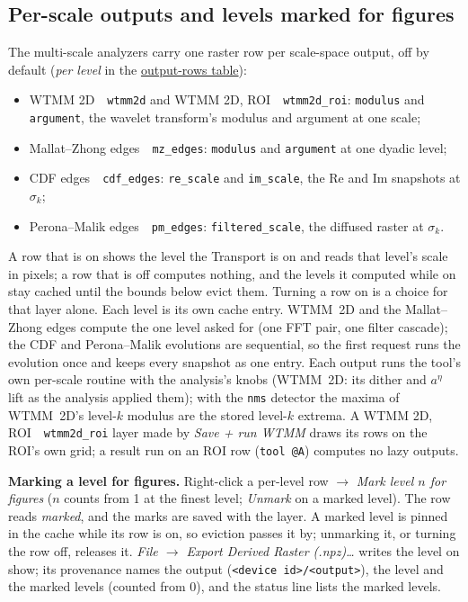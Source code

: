 \documentclass[10pt]{article}
\newcommand{\dev}[1]{\texttt{#1}}
\newcommand{\tool}[2]{#1~\textperiodcentered~\dev{#2}}
\begin{document}
\subsection*{Per-scale outputs and levels marked for figures}\label{sec:perscale}
The multi-scale analyzers carry one raster row per scale-space output, off by default
(\emph{per level} in the \hyperref[tab:outputs]{output-rows table}):
\begin{itemize}\itemsep2pt
  \item \tool{WTMM 2D}{wtmm2d} and \tool{WTMM 2D, ROI}{wtmm2d\_roi}: \texttt{modulus} and
        \texttt{argument}, the wavelet transform's modulus and argument at one scale;
  \item \tool{Mallat--Zhong edges}{mz\_edges}: \texttt{modulus} and \texttt{argument} at one
        dyadic level;
  \item \tool{CDF edges}{cdf\_edges}: \texttt{re\_scale} and \texttt{im\_scale}, the Re and Im
        snapshots at $\sigma_k$;
  \item \tool{Perona--Malik edges}{pm\_edges}: \texttt{filtered\_scale}, the diffused raster at
        $\sigma_k$.
\end{itemize}
A row that is on shows the level the Transport is on and reads that level's scale in pixels; a
row that is off computes nothing, and the levels it computed while on stay cached until the
bounds below evict them. Turning a row on is a choice for that layer alone.
Each level is its own cache entry. WTMM~2D and the Mallat--Zhong edges compute the one level
asked for (one FFT pair, one filter cascade); the CDF and Perona--Malik evolutions are
sequential, so the first request runs the evolution once and keeps every snapshot as one
entry. Each output runs the tool's own per-scale routine with the analysis's knobs (WTMM~2D:
its dither and $a^{\eta}$ lift as the analysis applied them); with the \texttt{nms} detector the
maxima of WTMM~2D's level-$k$ modulus are the stored level-$k$ extrema. A
\tool{WTMM 2D, ROI}{wtmm2d\_roi} layer made by \emph{Save + run WTMM} draws its rows on the
ROI's own grid; a result run on an ROI row (\texttt{tool @A}) computes no lazy outputs.

\textbf{Marking a level for figures.} Right-click a per-level row $\to$ \emph{Mark level $n$ for
figures} ($n$ counts from 1 at the finest level; \emph{Unmark} on a marked level). The row
reads \emph{marked}, and the marks are saved with the layer. A marked level is pinned in the
cache while its row is on, so eviction passes it by; unmarking it, or turning the row off,
releases it. \emph{File $\to$ Export Derived Raster (.npz)\ldots} writes the level on show; its
provenance names the output (\texttt{<device id>/<output>}), the level and the marked levels
(counted from 0), and the status line lists the marked levels.
\end{document}
